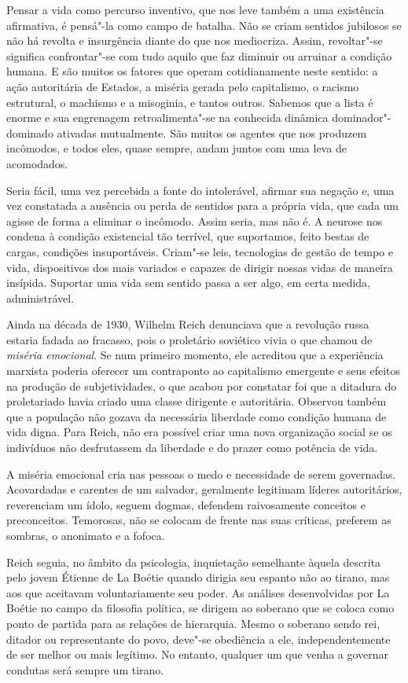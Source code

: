 Pensar a vida como percurso inventivo, que nos leve também a uma
existência afirmativa, é pensá"-la como campo de batalha. Não se criam
sentidos jubilosos se não há revolta e insurgência diante do que nos
mediocriza. Assim, revoltar"-se significa confrontar"-se com tudo aquilo
que faz diminuir ou arruinar a condição humana. E são muitos os
fatores que operam cotidianamente neste sentido: a ação autoritária de
Estados, a miséria gerada pelo capitalismo, o racismo estrutural, o
machismo e a misoginia, e tantos outros. Sabemos que a lista é enorme e
sua engrenagem retroalimenta"-se na conhecida dinâmica dominador"-dominado
ativadas mutualmente. São muitos os agentes que nos produzem incômodos,
e todos eles, quase sempre, andam juntos com uma leva de acomodados.

Seria fácil, uma vez percebida a fonte do intolerável, afirmar sua
negação e, uma vez constatada a ausência ou perda de sentidos para a
própria vida, que cada um agisse de forma a eliminar o incômodo. Assim
seria, mas não é. A neurose nos condena à condição existencial tão
terrível, que suportamos, feito bestas de cargas, condições
insuportáveis. Criam"-se leis, tecnologias de gestão de tempo e vida,
dispositivos dos mais variados e capazes de dirigir nossas vidas de
maneira insípida. Suportar uma vida sem sentido passa a ser algo, em
certa medida, administrável.

Ainda na década de 1930, Wilhelm Reich denunciava que a revolução russa
estaria fadada ao fracasso, pois o proletário soviético vivia o que
chamou de \emph{miséria emocional}. Se num primeiro momento, ele
acreditou que a experiência marxista poderia oferecer um contraponto ao
capitalismo emergente e seus efeitos na produção de subjetividades, o
que acabou por constatar foi que a ditadura do proletariado havia criado
uma classe dirigente e autoritária. Observou também que a população não
gozava da necessária liberdade como condição humana de vida digna. Para
Reich, não era possível criar uma nova organização social se os
indivíduos não desfrutassem da liberdade e do prazer como potência de
vida.

A miséria emocional cria nas pessoas o medo e necessidade de serem
governadas. Acovardadas e carentes de um salvador, geralmente legitimam
líderes autoritários, reverenciam um ídolo, seguem dogmas, defendem
raivosamente conceitos e preconceitos. Temorosas, não se colocam de
frente nas suas críticas, preferem as sombras, o anonimato e a fofoca.

Reich seguia, no âmbito da psicologia, inquietação semelhante àquela
descrita pelo jovem Étienne de La Boétie quando dirigia seu espanto não
ao tirano, mas aos que aceitavam voluntariamente seu poder. As análises
desenvolvidas por La Boétie no campo da filosofia política, se dirigem
ao soberano que se coloca como ponto de partida para as relações de
hierarquia. Mesmo o soberano sendo rei, ditador ou representante do
povo, deve"-se obediência a ele, independentemente de ser melhor ou mais
legítimo. No entanto, qualquer um que venha a governar condutas será
sempre um tirano.

